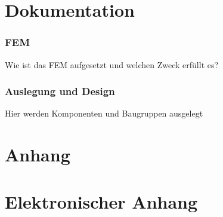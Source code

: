\documentclass[twoside, 11pt]{article}
\begin{document}
  

  \setcounter{page}{2}
  
  

  \tableofcontents
  \newpage

  
  \printnomenclature
  \newpage

  \setcounter{page}{1}
  \part{Dokumentation}
  
  
  
  
  \section{FEM}
  Wie ist das FEM aufgesetzt und welchen Zweck erfüllt es?
  \section{Auslegung und Design}
  Hier werden Komponenten und Baugruppen ausgelegt

  \part{Anhang}
  \appendix
  
  
  
  

  \part{Elektronischer Anhang}
  \appendix
  
\end{document}
